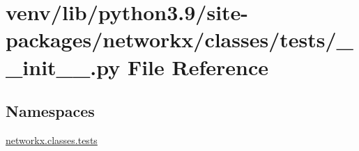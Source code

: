 \hypertarget{venv_2lib_2python3_89_2site-packages_2networkx_2classes_2tests_2____init_____8py}{}\section{venv/lib/python3.9/site-\/packages/networkx/classes/tests/\+\_\+\+\_\+init\+\_\+\+\_\+.py File Reference}
\label{venv_2lib_2python3_89_2site-packages_2networkx_2classes_2tests_2____init_____8py}
\subsection*{Namespaces}
\begin{DoxyCompactItemize}
\item 
 \hyperlink{namespacenetworkx_1_1classes_1_1tests}{networkx.\+classes.\+tests}
\end{DoxyCompactItemize}
